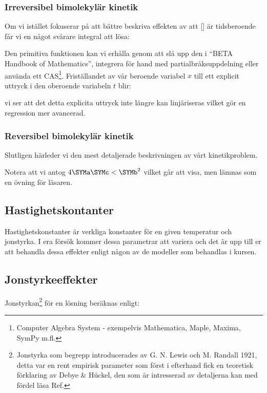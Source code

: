 \subsubsection{Irreversibel bimolekylär kinetik}
\label{sec:irrev_binary}
Om vi istället fokuserar på att bättre beskriva effekten av att
[] är tidsberoende får vi en något svårare integral att lösa:



Den primitiva funktionen kan vi erhålla genom att slå upp den i ``BETA Handbook of
Mathematics'', integrera för hand med partialbråksuppdelning eller
använda ett CAS\footnote{  Computer Algebra System -   exempelvis
  Mathematica, Maple, Maxima, SymPy m.fl.}. Friställandet av vår beroende
variabel $x$ till ett explicit uttryck i den oberoende variabeln $t$
blir:



vi ser att det detta explicita uttryck inte längre kan linjäriseras
vilket gör en regression mer avancerad.

\subsubsection{Reversibel bimolekylär kinetik}
Slutligen härleder vi den mest detaljerade beskrivningen av vårt kinetikproblem.
\label{sec:rev_binary}




Notera att vi antog $4\SYMa\SYMc < \SYMb^2$ vilket går att visa, men lämnas som en
övning för läsaren.


\subsection{Hastighetskontanter}
Hastighetskonstanter är verkliga konstanter för en given temperatur och
jonstyrka. I era försök kommer dessa parametrar att variera och det är
upp till er att behandla dessa effekter enligt någon av de modeller som
behandlas i kursen.

\subsection{Jonstyrkeeffekter}
Jonstyrkan\footnote{Jonstyrka som begrepp introducerades av
  G. N. Lewis och M. Randall 1921, detta var en rent empirisk parameter
  som först i efterhand fick en teoretisk förklaring av Debye \&
  H\"uckel, den som är intresserad av detaljerna kan med fördel läsa
  Ref.\cite{sastre_de_vicente_concept_2004}
} för en lösning beräknas enligt:

